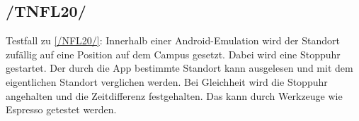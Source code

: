 \subsection*{/TNFL20/}
\label{/TNFL20/} Testfall zu \ref{/NFL20/}: Innerhalb einer \Gls{Android}-\Gls{Emulation} wird der Standort zufällig auf eine Position auf dem \Gls{Campus} gesetzt.
Dabei wird eine Stoppuhr gestartet.
Der durch die App bestimmte Standort kann ausgelesen und mit dem eigentlichen Standort verglichen werden.
Bei Gleichheit wird die Stoppuhr angehalten und die Zeitdifferenz festgehalten.
Das kann durch Werkzeuge wie \Gls{Espresso} getestet werden.